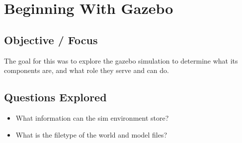 \section*{Beginning With Gazebo}

\subsection*{Objective / Focus}
The goal for this was to explore the gazebo simulation to determine what its components are, and what role they serve and can do.

\subsection*{Questions Explored}
\begin{itemize}
    \item What information can the sim environment store?
    \item What is the filetype of the world and model files?
\end{itemize}

